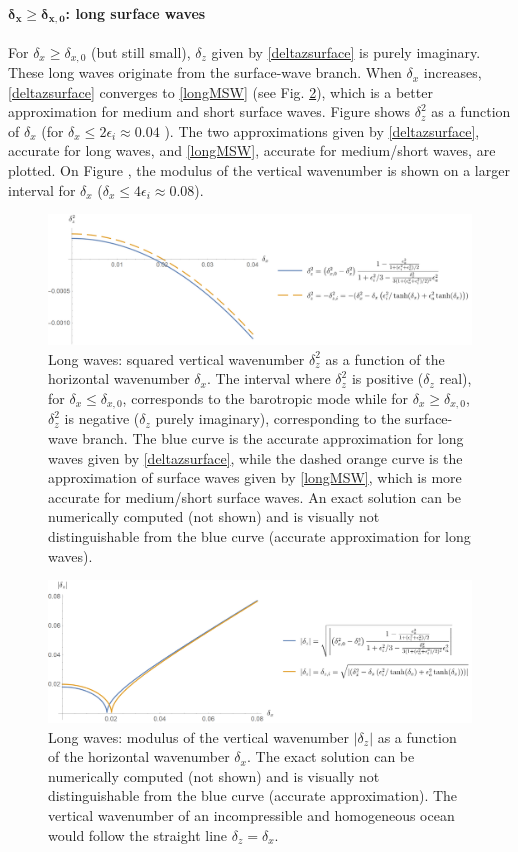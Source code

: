 \paragraph{$\boldsymbol{\delta_x \ge \delta_{x,0}}$: long surface waves}
For $\delta_x \ge \delta_{x,0}$ (but still small), $\delta_z$ given by \ref{deltazsurface} is purely imaginary. These long waves originate from the surface-wave branch.
When $\delta_x$ increases, \ref{deltazsurface} converges to \ref{longMSW} (see Fig. \ref{dzdx}), which is a better approximation for medium and short surface waves.
Figure  shows $\delta_z^2$ as a function of $\delta_x$ (for $\delta_x \le 2\epsilon_i \approx 0.04$ ). The two approximations given by \ref{deltazsurface}, accurate for long waves, and \ref{longMSW}, accurate for medium/short waves, are plotted. On Figure , the modulus of the vertical wavenumber is shown on a larger interval for $\delta_x$ ($\delta_x \le 4\epsilon_i \approx 0.08$).
\begin{figure}[h]
	\centerline{
		\includegraphics[width=0.9\linewidth]{FIGURES/dz2dx.png}
	}
\caption{Long waves: squared vertical wavenumber $\delta_z^2$ as a function of the horizontal wavenumber $\delta_x$. The interval where $\delta_z^2$ is positive ($\delta_z$ real), for $\delta_x\le \delta_{x,0}$, corresponds to the barotropic mode while for $\delta_x\ge \delta_{x,0}$, $\delta_z^2$ is negative ($\delta_z$ purely imaginary), corresponding to the surface-wave branch. The blue curve is the accurate approximation for long waves given by \ref{deltazsurface}, while the dashed orange curve is the approximation of surface waves given by \ref{longMSW}, which is more accurate for medium/short surface waves. An exact solution can be numerically computed (not shown) and is visually not distinguishable from the blue curve (accurate approximation for long waves).}
\label{dz2dx}
\end{figure}
\begin{figure}[h]
	\centerline{
		\includegraphics[width=0.9\linewidth]{FIGURES/dzdx.png}
	}
	\caption{Long waves: modulus of the vertical wavenumber $|\delta_z|$ as a function of the horizontal wavenumber $\delta_x$. The exact solution can be numerically computed (not shown) and is visually not distinguishable from the blue curve (accurate approximation). The vertical wavenumber of an incompressible and homogeneous ocean would follow the straight line $\delta_z=\delta_x$.}
	\label{dzdx}
\end{figure}
